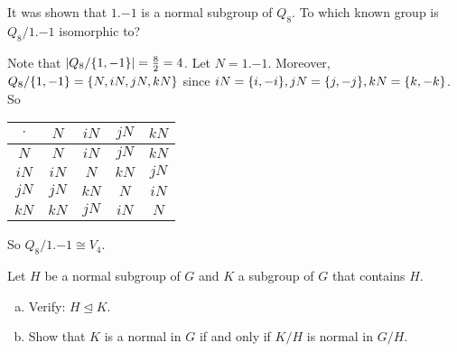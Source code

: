 \begin{exercise}
    It was shown that $\qty{1, -1}$ is a normal subgroup of $Q_8$. To which known group is $Q_8/ \qty{1, -1}$ isomorphic to?
\end{exercise}

\begin{solution}
    Note that $\qty|Q_8 / \qty{1, -1}| = \frac{8}{2} = 4$. Let $N = \qty{1, -1}$. Moreover, $Q_8/\qty{1, -1} = \qty{N, iN, jN, kN}$ since $iN = \qty{i, -i}, jN = \qty{j, -j}, kN = \qty{k, -k}$. So
    
    \vspace{1em}
    
    \begin{center}
        \begin{tabular}{c | c c c c}
             $\cdot$ &  $N$ & $iN$ & $jN$ & $kN$ \\
             \hline
             $N$ &  $N$ & $iN$ & $jN$ & $kN$ \\
             $iN$ &  $iN$ & $N$ & $kN$ & $jN$ \\
             $jN$ &  $jN$ & $kN$ & $N$ & $iN$ \\
             $kN$ &  $kN$ & $jN$ & $iN$ & $N$ \\
        \end{tabular}
    \end{center}
    So $Q_8 / \qty{1, -1} \cong V_4$. \qedsymbol
\end{solution}

\begin{exercise}
    Let $H$ be a normal subgroup of $G$ and $K$ a subgroup of $G$ that contains $H$.
    \begin{enumerate}[(a)]
        \item Verify: $H \unlhd K$.
        \item Show that $K$ is a normal in $G$ if and only if $K / H$ is normal in $G/ H$.
    \end{enumerate}
\end{exercise}

